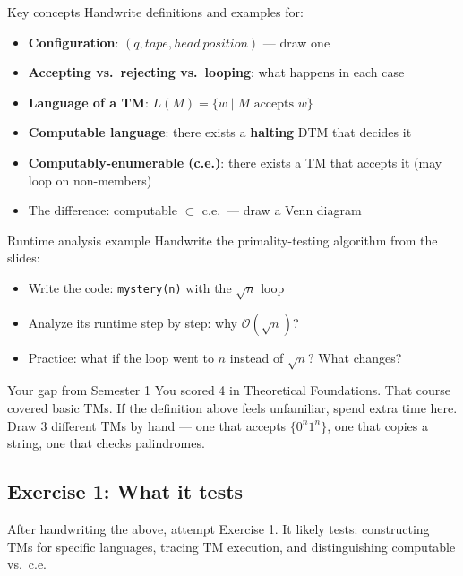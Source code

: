 \documentclass[11pt,a4paper]{article}
\begin{document}
\begin{writebox}{Key concepts}
Handwrite definitions and examples for:
\begin{itemize}[nosep]
\item \textbf{Configuration}: $(q, tape, head\ position)$ --- draw one
\item \textbf{Accepting vs.\ rejecting vs.\ looping}: what happens in each case
\item \textbf{Language of a TM}: $L(M) = \{w \mid M \text{ accepts } w\}$
\item \textbf{Computable language}: there exists a \textbf{halting} DTM that decides it
\item \textbf{Computably-enumerable (c.e.)}: there exists a TM that accepts it (may loop on non-members)
\item The difference: computable $\subset$ c.e.\ --- draw a Venn diagram
\end{itemize}
\end{writebox}

\begin{writebox}{Runtime analysis example}
Handwrite the primality-testing algorithm from the slides:
\begin{itemize}[nosep]
\item Write the code: \texttt{mystery(n)} with the $\sqrt{n}$ loop
\item Analyze its runtime step by step: why $\mathcal{O}(\sqrt{n})$?
\item Practice: what if the loop went to $n$ instead of $\sqrt{n}$? What changes?
\end{itemize}
\end{writebox}

\begin{dangerbox}{Your gap from Semester 1}
You scored 4 in Theoretical Foundations. That course covered basic TMs. If the definition above feels unfamiliar, spend extra time here. Draw 3 different TMs by hand --- one that accepts $\{0^n1^n\}$, one that copies a string, one that checks palindromes.
\end{dangerbox}

\subsection*{Exercise 1: What it tests}
After handwriting the above, attempt Exercise 1. It likely tests: constructing TMs for specific languages, tracing TM execution, and distinguishing computable vs.\ c.e.

\end{document}
